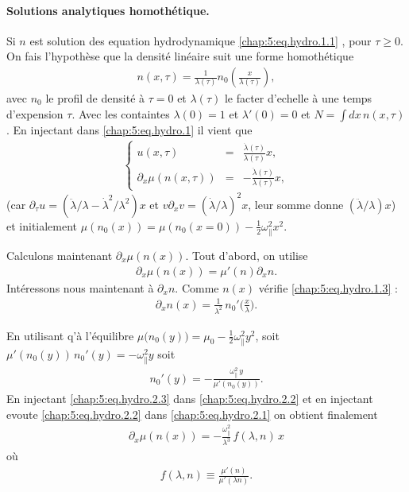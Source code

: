 \paragraph{Solutions analytiques homothétique.}
Si $n$ est solution des equation hydrodynamique \eqref{chap:5:eq.hydro.1.1} , pour $\tau \geq 0$. On fais l'hypothèse que la densité linéaire suit une forme homothétique
\begin{eqnarray}\label{chap:5:eq.hydro.1.3}
	n(x,\tau) = \frac{1}{\lambda(\tau)} n_0 \left ( \frac{x}{\lambda(\tau)} \right ) ,	
\end{eqnarray}
avec $n_0$ le profil de densité à $\tau = 0 $ et $\lambda(\tau)$ le facter d'echelle à une temps d'expension $\tau$. Avec les containtes $\lambda(0) = 1$ et $\lambda'(0) = 0$ et $N = \int dx \, n(x , \tau ) $. En injectant dans \eqref{chap:5:eq.hydro.1} il vient que 
\begin{eqnarray}\label{chap:5:eq.hydro.2}
	\left\{
	\begin{array}{rcl}
		u(x, \tau ) & = & \displaystyle \frac{\dot\lambda(\tau)}{\lambda(\tau)} x , \\[0.3em]
		\partial_x \mu ( n ( x , \tau ))  & = & - \displaystyle \frac{\ddot\lambda(\tau)}{\lambda(\tau)} x,
	\end{array} 
	\right.
\end{eqnarray}
(car \(\partial_\tau u=(\ddot\lambda/\lambda-\dot\lambda^2/\lambda^2)x\) et \(v\partial_x v=(\dot\lambda/\lambda)^2 x\), leur somme donne \((\ddot\lambda/\lambda)x\)) et initialement $\mu( n_0 ( x ) ) = \mu( n_0 ( x = 0  ) ) - \frac{1}{2} \omega_\parallel^2 x^2 $.

\bigskip

Calculons maintenant \(\partial_x\mu(n(x))\). Tout d'abord, on utilise 
\begin{eqnarray}\label{chap:5:eq.hydro.2.1}
	\partial_x\mu(n(x)) = \mu'(n)\partial_x n.
\end{eqnarray}
Intéressons nous maintenant à $\partial_x n$. Comme $n(x)$ vérifie \eqref{chap:5:eq.hydro.1.3} :
\begin{eqnarray}\label{chap:5:eq.hydro.2.2}
	\partial_x n(x)=\frac{1}{\lambda^2}\,n_0'\!\Big(\frac{x}{\lambda}\Big).	
\end{eqnarray}

En utilisant q'à l'équilibre \(\mu\big(n_0(y)\big)=\mu_0-\tfrac12 \omega_\parallel^2 y^2\), soit \(\mu'(n_0(y))\,n_0'(y)=-\omega_\parallel^2 y\) soit 
\begin{eqnarray}\label{chap:5:eq.hydro.2.3}
	n_0'(y)=-\frac{\omega_\parallel^2\,y}{\mu'(n_0(y))}.	
\end{eqnarray}
En injectant \eqref{chap:5:eq.hydro.2.3} dans \eqref{chap:5:eq.hydro.2.2} et en injectant evoute \eqref{chap:5:eq.hydro.2.2} dans \eqref{chap:5:eq.hydro.2.1} on obtient finalement
\begin{eqnarray}\label{chap:5:eq.hydro.2.4}
	\partial_x \mu ( n (x)) = -\frac{\omega_\parallel^2}{\lambda^3}\,f(\lambda,n)\,x 	
\end{eqnarray}
où
\begin{eqnarray}\label{chap:5:eq.hydro.2.4}
	f(\lambda,n)\equiv\frac{\mu'(n)}{\mu'(\lambda n)}.	
\end{eqnarray}

